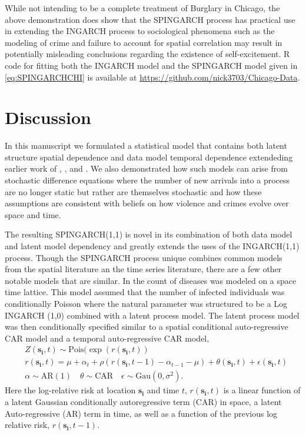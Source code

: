 \documentclass[11pt]{isuthesis}
\begin{document}
While not intending to be a complete treatment of Burglary in Chicago, the above demonstration does show that the SPINGARCH process has practical use in extending the INGARCH process to sociological phenomena such as the modeling of crime and failure to account for spatial correlation may result in potentially misleading conclusions regarding the existence of self-excitement.  R code for fitting both the INGARCH model and the SPINGARCH model given in \eqref{eq:SPINGARCHCHI} is available at \url{https://github.com/nick3703/Chicago-Data}.

\section{Discussion}

In this manuscript we formulated a statistical model that contains both latent structure spatial dependence and data model temporal dependence extendeding earlier work of \cite{ferland2006integer}, \cite{fokianos2009poisson}, and \cite{davis2016theory}.  We also demonstrated how such models can arise from stochastic difference equations where the number of new arrivals into a process are no longer static but rather are themselves stochastic and how these assumptions are consistent with beliefs on how violence and crimes evolve over space and time.

The resulting SPINGARCH(1,1) is novel in its combination of both data model and latent model dependency and greatly extends the uses of the INGARCH(1,1) process. 
Though the SPINGARCH process unique combines common models from the spatial literature an the time series literature, there are a few other notable models that are similar.  In \cite{martinez2008autoregressive} the count of diseases was modeled on a space time lattice.  This model assumed that the number of infected individuals was conditionally Poisson where the natural parameter was structured to be a Log INGARCH (1,0) combined with a latent process model.  The latent process model was then conditionally specified similar to a spatial conditional auto-regressive CAR model and a temporal auto-regressive CAR model,  
\begin{align}
	& Z(\boldsymbol{s_i},t)\sim \mbox{Pois}(\exp(r(\boldsymbol{s_i},t))\\
	& r(\boldsymbol{s_i},t) = \mu+\alpha_t + \rho \left(r(\boldsymbol{s_i},t-1) -\alpha_{t-1}-\mu\right) + \theta(\boldsymbol{s_i},t)+\epsilon(\boldsymbol{s_i},t)\\
	& \alpha \sim \mbox{AR}(1)
	\quad \theta \sim \mbox{CAR} \quad \epsilon \sim \mbox{Gau}(0,\sigma^2).
\end{align}
Here the log-relative risk at location $\boldsymbol{s_i}$ and time $t$, $r(\boldsymbol{s_i},t)$ is a linear function of a latent Gaussian conditionally autoregressive term (CAR) in space, a latent Auto-regressive (AR) term in time, as well as a function of the previous log relative risk, $r(\boldsymbol{s_i},t-1)$.
\end{document}
